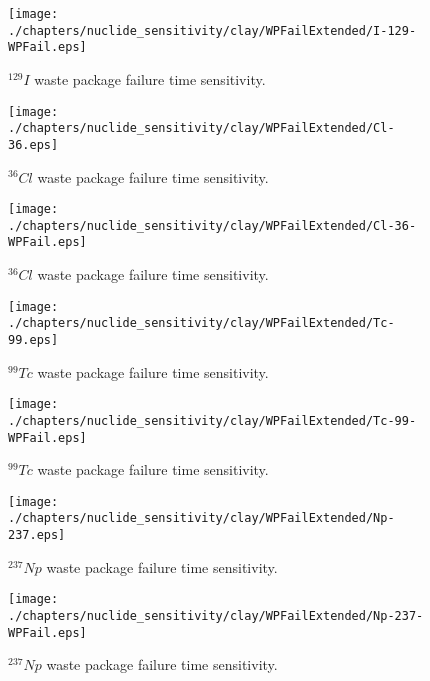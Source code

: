 \begin{figure}[ht!]
\centering
\texttt{[image: ./chapters/nuclide\_sensitivity/clay/WPFailExtended/I-129-WPFail.eps]}
\caption{$^{129}I$ waste package failure time sensitivity. }
\label{fig:WPFailI129}
\end{figure}

\begin{figure}[ht!]
\centering
\texttt{[image: ./chapters/nuclide\_sensitivity/clay/WPFailExtended/Cl-36.eps]}
\caption{$^{36}Cl$ waste package failure time sensitivity. }
\label{fig:WPFailCl36}
\end{figure}

\begin{figure}[ht!]
\centering
\texttt{[image: ./chapters/nuclide\_sensitivity/clay/WPFailExtended/Cl-36-WPFail.eps]}
\caption{$^{36}Cl$ waste package failure time sensitivity. }
\label{fig:WPFailPuDaughters}
\end{figure}

\begin{figure}[ht!]
\centering
\texttt{[image: ./chapters/nuclide\_sensitivity/clay/WPFailExtended/Tc-99.eps]}
\caption{$^{99}Tc$ waste package failure time sensitivity. }
\label{fig:WPFailTc99}
\end{figure}

\begin{figure}[ht!]
\centering
\texttt{[image: ./chapters/nuclide\_sensitivity/clay/WPFailExtended/Tc-99-WPFail.eps]}
\caption{$^{99}Tc$ waste package failure time sensitivity. }
\label{fig:WPFailTc99}
\end{figure}

\begin{figure}[ht!]
\centering
\texttt{[image: ./chapters/nuclide\_sensitivity/clay/WPFailExtended/Np-237.eps]}
\caption{$^{237}Np$ waste package failure time sensitivity. }
\label{fig:WPFailNp237}
\end{figure}

\begin{figure}[ht!]
\centering
\texttt{[image: ./chapters/nuclide\_sensitivity/clay/WPFailExtended/Np-237-WPFail.eps]}
\caption{$^{237}Np$ waste package failure time sensitivity. }
\label{fig:WPFailPuDaughters}
\end{figure}


\clearpage


